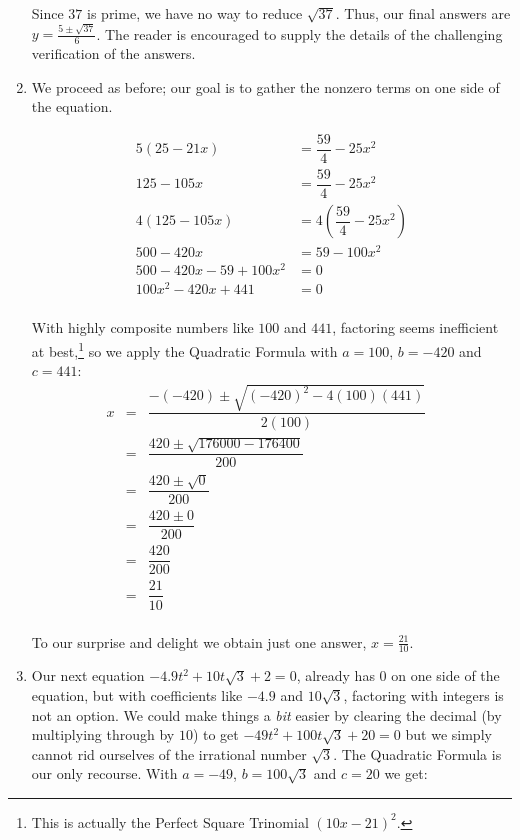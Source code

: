 \begin{ex}
\begin{enumerate}
Since $37$ is prime, we have no way to reduce $\sqrt{37}$.  Thus, our final answers are $y = \frac{5 \pm \sqrt{37}}{6}$. The reader is encouraged to supply the details of the challenging verification of the answers.

\item  We proceed as before; our goal is to gather the nonzero terms on one side of the equation.

\begin{align*}
5(25 - 21x) & = \dfrac{59}{4} - 25x^2 \\
125 - 105x & = \dfrac{59}{4} - 25x^2 \tag{Distribute} \\
4(125 - 105x) & = 4\left(\dfrac{59}{4} - 25x^2 \right) \tag{Multiply by $4$} \\
500 - 420x & = 59 - 100x^2 \tag{Distribute} \\ 
500 - 420x - 59 + 100x^2 & = 0 \tag{Subtract $59$, Add $100x^2$} \\
100x^2 - 420x + 441 & = 0 \tag{Gather like terms} \\  
\end{align*}

With highly composite numbers like $100$ and $441$, factoring seems inefficient at best,\footnote{This is actually the Perfect Square Trinomial $(10x - 21)^2$.} so we apply the Quadratic Formula with $a = 100$, $b = -420$ and $c = 441$:\[ \begin{array}{rclr}

x & = & \dfrac{-(-420) \pm \sqrt{(-420)^2 - 4(100)(441)}}{2(100)} & \\ [12pt]

 & = & \dfrac{420 \pm \sqrt{176000 - 176400}}{200} & \\ [12pt]

& = & \dfrac{420 \pm \sqrt{0}}{200} & \\ [12pt]

& = & \dfrac{420 \pm 0}{200} & \\ [12pt]
& = & \dfrac{420}{200} & \\ [12pt]

& = & \dfrac{21}{10} & \\

\end{array} \]

To our surprise and delight we obtain just one answer, $x = \frac{21}{10}$.

\item  Our next equation $-4.9t^2 + 10t\sqrt{3} + 2 = 0$, already has $0$ on one side of the equation, but with coefficients like $-4.9$ and $10\sqrt{3}$, factoring with integers is not an option.  We could make things a \textit{bit} easier by clearing the decimal (by multiplying through by $10$) to get  $-49t^2 + 100t\sqrt{3} + 20 = 0$ but we simply cannot rid ourselves of the irrational number $\sqrt{3}$.  The Quadratic Formula is our only recourse.  With $a = -49$, $b = 100\sqrt{3}$ and $c = 20$ we get: 


\end{enumerate}
\end{ex}
